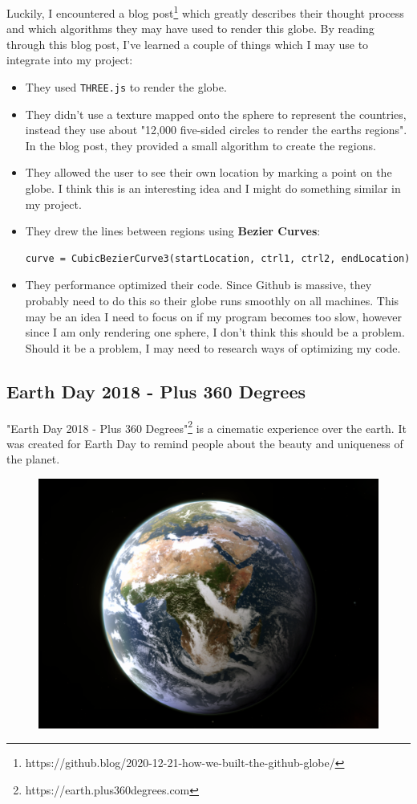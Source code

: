 Luckily, I encountered a blog post\footnote{https://github.blog/2020-12-21-how-we-built-the-github-globe/} which greatly describes their thought process and which algorithms they may have used to render this globe.
By reading through this blog post, I've learned a couple of things which I may use to integrate into my project:
\begin{itemize}
\item They used \verb|THREE.js| to render the globe.
\item They didn't use a texture mapped onto the sphere to represent the countries, instead they use about "12,000 five-sided circles to render the earths regions". In the blog post, they provided a small algorithm to create the regions.
\item They allowed the user to see their own location by marking a point on the globe. I think this is an interesting idea and I might do something similar in my project.
\item They drew the lines between regions using \textbf{Bezier Curves}:
\begin{lstlisting}
curve = CubicBezierCurve3(startLocation, ctrl1, ctrl2, endLocation)
\end{lstlisting}
\item They performance optimized their code. Since Github is massive, they probably need to do this so their globe runs smoothly on all machines. This may be an idea I need to focus on if my program becomes too slow, however since I am only rendering one sphere, I don't think this should be a problem. Should it be a problem, I may need to research ways of optimizing my code.
\end{itemize}

\newpage

\subsection{Earth Day 2018 - Plus 360 Degrees}
"Earth Day 2018 - Plus 360 Degrees"\footnote{https://earth.plus360degrees.com} is a cinematic experience over the earth. It was created for Earth Day to remind people about the beauty and uniqueness of the planet. \\
\begin{figure}[h]
\centering
\includegraphics[width=0.7\linewidth]{images/screenshot002}
\caption{}
\label{fig:screenshot002}
\end{figure}


